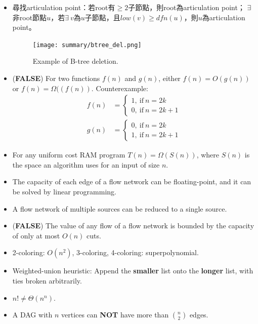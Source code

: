 \begin{itemize}
\begin{algorithm}[H]
    \end{algorithm}
    \item 尋找articulation point：若root有$\ge 2$子節點，則root為articulation point；
    $\exists$ 非root節點$u$，若$\exists \ v$為$u$子節點，且$low(v) \ge dfn(u)$，則$u$為articulation point。
    \begin{figure}[H]
        \centering
        \texttt{[image: summary/btree\_del.png]}
        \caption{Example of B-tree deletion.}
        \label{img:np-conp}
    \end{figure}
    \item (\textbf{FALSE}) For two functions $f(n)$ and $g(n)$, either $f(n) = O(g(n))$ or $f(n) = \Omega((f(n))$.
    Counterexample:\begin{equation}
        \begin{aligned}
            f(n) & = \begin{cases}
                1, \ \text{if} \ n = 2k \\
                0, \ \text{if} \ n = 2k + 1
            \end{cases} \\
            g(n) & = \begin{cases}
                0, \ \text{if} \ n = 2k \\
                1, \ \text{if} \ n = 2k + 1
            \end{cases} 
        \end{aligned}
    \end{equation}
    \item For any uniform cost RAM program $T(n) = \Omega(S(n))$, where $S(n)$ is the space an algorithm uses for an input of size $n$.
    \item The capacity of each edge of a flow network can be floating-point, and it can be solved by linear programming.
    \item A flow network of multiple sources can be reduced to a single source.
    \item (\textbf{FALSE}) The value of any flow of a flow network is bounded by the capacity of only at most $O(n)$ cuts.
    \item 2-coloring: $O(n^2)$, 3-coloring, 4-coloring: superpolynomial.
    \item Weighted-union heuristic: Append the \textbf{smaller} list onto the \textbf{longer} list, with ties broken arbitrarily.
    \item $n! \neq \Theta(n^n)$.
    \item A DAG with $n$ vertices can \textbf{NOT} have more than $\binom{n}{2}$ edges.

\end{itemize}
